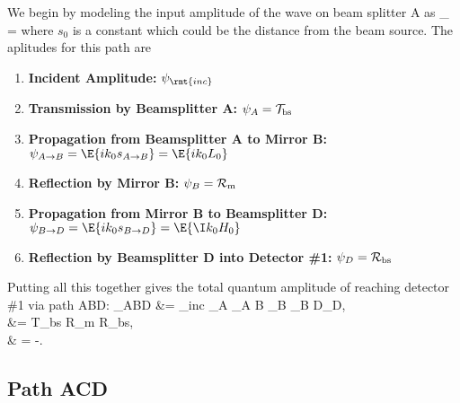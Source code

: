 We begin by modeling the input amplitude of the wave on beam splitter A as
%
\beq
\psi_ = 
\eeq
%
where $s_{0}$ is a constant which could be the distance from the beam source. The aplitudes for this path are
\begin{enumerate}
\item{\bf Incident Amplitude:} $\psi_\rmt{inc}$
\item{\bf Transmission by Beamsplitter A:} $\psi_{A} = {\cal T}_{\rm bs}$
\item{\bf Propagation from Beamsplitter A to Mirror B:} $\psi_{A \rightarrow B} = \E{ik_{0}s_{A \rightarrow B}} = \E{ik_{0}L_{0}}$
\item{\bf Reflection by Mirror B:} $\psi_{B} = {\cal R}_{\rm m}$
\item{\bf Propagation from Mirror B  to Beamsplitter D:} $\psi_{B \rightarrow D} = \E{ik_{0}s_{B \rightarrow D}} = \E{\I k_{0}H_{0}}$
\item{\bf Reflection  by Beamsplitter D into Detector \#1:} $\psi_{D} = {\cal R}_{\rm bs}$
\end{enumerate}
%
Putting all this together gives the total quantum amplitude of reaching detector \#1 via path ABD:
%
\bas
\psi_{ABD} &=   \psi_{\rm inc} \psi_{A} \psi_{A \rightarrow B} \psi_{B}  \psi_{B \rightarrow D}\psi_{D}, \\
	&=   {\cal T}_{\rm bs}  {\cal R}_{\rm m}      {\cal R}_{\rm bs}, \\
	& =  -\I{}.
	\label{psi ABD}
\eas

\subsection{Path ACD}

